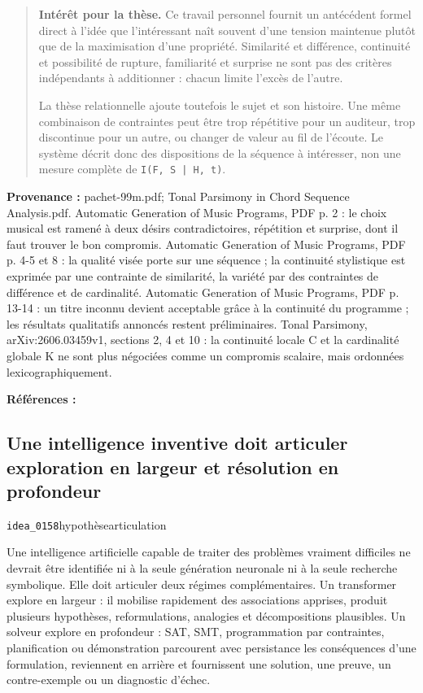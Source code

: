 \documentclass[10pt,a4paper]{article}
\begin{document}
\begin{quote}
\textbf{Intérêt pour la thèse.} Ce travail personnel fournit un antécédent formel direct à l'idée que l'intéressant naît souvent d'une tension maintenue plutôt que de la maximisation d'une propriété. Similarité et différence, continuité et possibilité de rupture, familiarité et surprise ne sont pas des critères indépendants à additionner : chacun limite l'excès de l'autre.

La thèse relationnelle ajoute toutefois le sujet et son histoire. Une même combinaison de contraintes peut être trop répétitive pour un auditeur, trop discontinue pour un autre, ou changer de valeur au fil de l'écoute. Le système décrit donc des dispositions de la séquence à intéresser, non une mesure complète de \texttt{I(F, S | H, t)}.
\end{quote}
{\footnotesize\color{metadata}\textbf{Provenance :} pachet-99m.pdf; Tonal Parsimony in Chord Sequence Analysis.pdf. Automatic Generation of Music Programs, PDF p. 2 : le choix musical est ramené à deux désirs contradictoires, répétition et surprise, dont il faut trouver le bon compromis. Automatic Generation of Music Programs, PDF p. 4-5 et 8 : la qualité visée porte sur une séquence ; la continuité stylistique est exprimée par une contrainte de similarité, la variété par des contraintes de différence et de cardinalité. Automatic Generation of Music Programs, PDF p. 13-14 : un titre inconnu devient acceptable grâce à la continuité du programme ; les résultats qualitatifs annoncés restent préliminaires. Tonal Parsimony, arXiv:2606.03459v1, sections 2, 4 et 10 : la continuité locale C et la cardinalité globale K ne sont plus négociées comme un compromis scalaire, mais ordonnées lexicographiquement.\par}
{\footnotesize\color{metadata}\textbf{Références :} \parencite{pachet1999programs,pachet2026tonalparsimony}\par}

\subsection{Une intelligence inventive doit articuler exploration en largeur et résolution en profondeur}
{\small\color{metadata} \texttt{idea\_0158}\quad\textbullet\quad hypothèse\quad\textbullet\quad articulation\par}

Une intelligence artificielle capable de traiter des problèmes vraiment difficiles ne devrait être identifiée ni à la seule génération neuronale ni à la seule recherche symbolique. Elle doit articuler deux régimes complémentaires. Un transformer explore en largeur : il mobilise rapidement des associations apprises, produit plusieurs hypothèses, reformulations, analogies et décompositions plausibles. Un solveur explore en profondeur : SAT, SMT, programmation par contraintes, planification ou démonstration parcourent avec persistance les conséquences d'une formulation, reviennent en arrière et fournissent une solution, une preuve, un contre-exemple ou un diagnostic d'échec.
\end{document}
